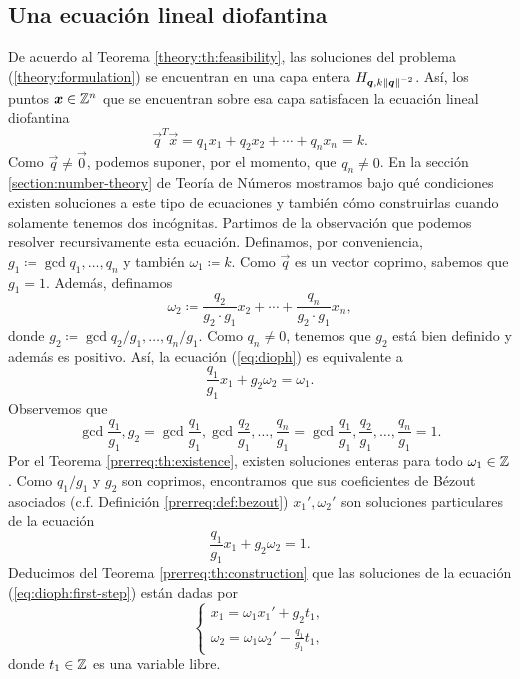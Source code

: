 \subsection{Una ecuación lineal diofantina}
\noindent
De acuerdo al Teorema \ref{theory:th:feasibility}, las soluciones del problema
(\ref{theory:formulation}) se encuentran en una capa entera $H_{\boldsymbol{q}, k\left\lVert \boldsymbol{q} \right\rVert^{-2}}$.
Así, los puntos $\boldsymbol{x} \in \mathbb{Z}^n$ que se encuentran sobre esa capa satisfacen la ecuación lineal
diofantina
\begin{equation}
	\label{eq:dioph}
	\vec{q}^T\vec{x} = q_1x_1 + q_2x_2 + \cdots + q_nx_n = k.
\end{equation}
Como $\vec{q} \neq \vec{0}$, podemos suponer, por el momento, que $q_n \neq 0$. En la sección
\ref{section:number-theory} de Teoría de Números mostramos bajo qué condiciones existen soluciones a
este tipo de ecuaciones y también cómo construirlas cuando solamente tenemos dos incógnitas.
Partimos de la observación que podemos resolver recursivamente esta ecuación. Definamos, por
conveniencia, $g_1 \coloneq \gcd{q_1, \ldots, q_n}$ y también $\omega_1 \coloneq k$. Como $\vec{q}$
es un vector coprimo, sabemos que $g_1 = 1$. Además, definamos
\begin{equation*}
	\omega_2 \coloneq \frac{q_2}{g_2 \cdot g_1}x_2 + \cdots + \frac{q_n}{g_2 \cdot
	g_1}x_n,
\end{equation*}
donde $g_2 \coloneq \gcd{q_2/g_1, \ldots, q_n/g_1}$. Como $q_n \neq 0$, tenemos que $g_2$ está bien
definido y además es positivo. Así, la ecuación (\ref{eq:dioph}) es equivalente a
\begin{equation}
	\label{eq:dioph:first-step}
	\frac{q_1}{g_1}x_1 + g_2\omega_2 = \omega_1.
\end{equation}
Observemos que
\begin{equation*}
	\gcd{\frac{q_1}{g_1}, g_2}
	= \gcd{\frac{q_1}{g_1}, \gcd{\frac{q_2}{g_1}, \ldots, \frac{q_n}{g_1}}}
	= \gcd{\frac{q_1}{g_1}, \frac{q_2}{g_1}, \ldots, \frac{q_n}{g_1}} = 1.
\end{equation*}
Por el Teorema \ref{prerreq:th:existence}, existen soluciones enteras para todo $\omega_1 \in \mathbb{Z}$.
Como $q_1/g_1$ y $g_2$ son coprimos, encontramos que sus coeficientes de Bézout asociados (c.f.
Definición \ref{prerreq:def:bezout}) $x_1', \omega_2'$ son soluciones particulares de la ecuación
\begin{equation*}
	\frac{q_1}{g_1}x_1 + g_2\omega_2 = 1.
\end{equation*}
Deducimos del Teorema \ref{prerreq:th:construction} que las soluciones de la ecuación
(\ref{eq:dioph:first-step}) están dadas por
\begin{equation}
	\label{dummy:eq:first-step}
	\begin{cases}
		x_1 = \omega_1x_1' + g_2t_1, \\
		\omega_2 = \omega_1\omega_2' - \frac{q_1}{g_1}t_1,
	\end{cases}
\end{equation}
donde $t_1 \in \mathbb{Z}$ es una variable libre.

